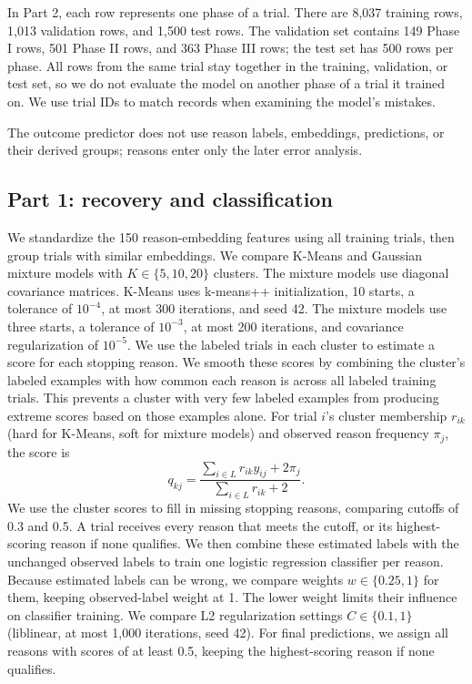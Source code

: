 \documentclass[10pt,twocolumn,letterpaper]{article}
\begin{document}
In Part 2, each row represents one phase of a trial. There are 8,037 training
rows, 1,013 validation rows, and 1,500 test rows. The validation set contains
149 Phase I rows, 501 Phase II rows, and 363 Phase III rows; the test set has
500 rows per phase. All rows from the same trial stay together in the training,
validation, or test set, so we do not evaluate the model on another phase of a
trial it trained on. We use trial IDs to match records when examining the
model's mistakes.

The outcome predictor does not use reason labels, embeddings, predictions,
or their derived groups; reasons enter only the later error analysis.

\subsection{Part 1: recovery and classification}
We standardize the 150 reason-embedding features using all training trials,
then group trials with similar embeddings. We compare K-Means and Gaussian
mixture models with $K\in\{5,10,20\}$ clusters. The mixture models use diagonal
covariance matrices.
K-Means uses k-means++ initialization, 10 starts, a tolerance of $10^{-4}$,
at most 300 iterations, and seed 42. The mixture models use three starts,
a tolerance of $10^{-3}$, at most 200 iterations, and covariance regularization
of $10^{-5}$. We use the labeled trials in each cluster to estimate a score
for each stopping reason. We smooth these scores by combining the cluster's
labeled examples with how common each reason is across all labeled training
trials. This prevents a cluster with very few labeled examples from producing
extreme scores based on those examples alone.
For trial $i$'s cluster membership $r_{ik}$ (hard for K-Means, soft for mixture
models) and observed reason frequency $\pi_j$, the score is
\begin{equation}
q_{kj}=\frac{\sum_{i\in L}r_{ik}y_{ij}+2\pi_j}{\sum_{i\in L}r_{ik}+2}.
\end{equation}
We use the cluster scores to fill in missing stopping reasons, comparing cutoffs
of 0.3 and 0.5. A trial receives every reason that meets the cutoff, or its
highest-scoring reason if none qualifies. We then combine these estimated labels
with the unchanged observed labels to train one logistic regression classifier
per reason. Because estimated labels can be wrong, we compare weights
$w\in\{0.25,1\}$ for them, keeping observed-label weight at 1. The lower weight
limits their influence on classifier training. We compare L2 regularization
settings $C\in\{0.1,1\}$ (liblinear, at most 1,000 iterations, seed 42).
For final predictions, we assign all reasons with scores of at least 0.5,
keeping the highest-scoring reason if none qualifies.
\end{document}
